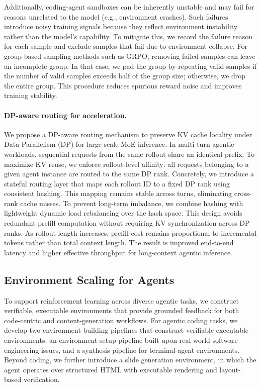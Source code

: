 \documentclass{article}
\theoremstyle{definition}
\begin{document}
Additionally, coding-agent sandboxes can be inherently unstable and may fail for reasons unrelated to the model (e.g., environment crashes). Such failures introduce noisy training signals because they reflect environment instability rather than the model’s capability. To mitigate this, we record the failure reason for each sample and exclude samples that fail due to environment collapse. For group-based sampling methods such as GRPO, removing failed samples can leave an incomplete group. In that case, we pad the group by repeating valid samples if the number of valid samples exceeds half of the group size; otherwise, we drop the entire group. This procedure reduces spurious reward noise and improves training stability.

\paragraph{DP-aware routing for acceleration.}
We propose a DP-aware routing mechanism to preserve KV cache locality under Data Parallelism (DP) for large-scale MoE inference. In multi-turn agentic workloads, sequential requests from the same rollout share an identical prefix. To maximize KV reuse, we enforce rollout-level affinity: all requests belonging to a given agent instance are routed to the same DP rank. Concretely, we introduce a stateful routing layer that maps each rollout ID to a fixed DP rank using consistent hashing. This mapping remains stable across turns, eliminating cross-rank cache misses. To prevent long-term imbalance, we combine hashing with lightweight dynamic load rebalancing over the hash space. This design avoids redundant prefill computation without requiring KV synchronization across DP ranks. As rollout length increases, prefill cost remains proportional to incremental tokens rather than total context length. The result is improved end-to-end latency and higher effective throughput for long-context agentic inference.

\subsection{Environment Scaling for Agents}

To support reinforcement learning across diverse agentic tasks, we construct verifiable, executable environments that provide grounded feedback for both code-centric and content-generation workflows.
For agentic coding tasks, we develop two environment-building pipelines that construct verifiable executable environments: an environment setup pipeline built upon real-world software engineering issues, and a synthesis pipeline for terminal-agent environments.
Beyond coding, we further introduce a slide generation environment, in which the agent operates over structured HTML with executable rendering and layout-based verification.
\end{document}
